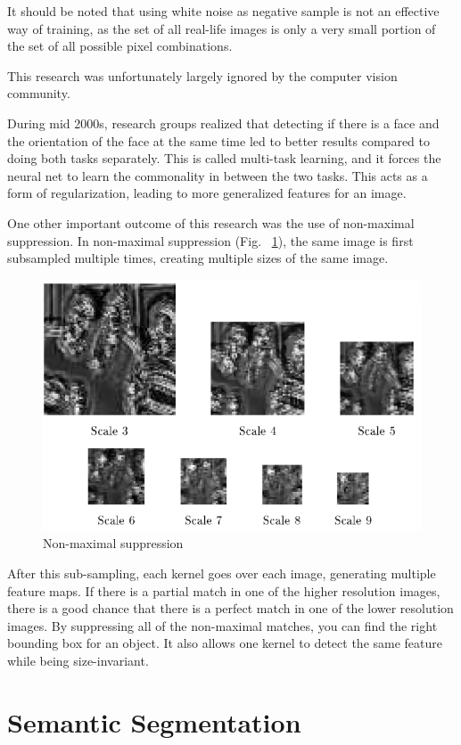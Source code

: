 It should be noted that using white noise as negative sample is not an effective way of training, as the set of all real-life images is only a very small portion of the set of all possible pixel combinations.

This research was unfortunately largely ignored by the computer vision community.

During mid 2000s, research groups realized that detecting if there is a face and the orientation of the face at the same time led to better results compared to doing both tasks separately.
This is called multi-task learning, and it forces the neural net to learn the commonality in between the two tasks.
This acts as a form of regularization, leading to more generalized features for an image.

One other important outcome of this research was the use of non-maximal suppression.
In non-maximal suppression (Fig. ~\ref{fig:NonMaxSupp}), the same image is first subsampled multiple times, creating multiple sizes of the same image.

\begin{figure}[ht]
\centering
	\includegraphics[width=0.5\linewidth]{lectures/04-a/images/non-max-supp.png}
	 \caption{Non-maximal suppression}
	\label{fig:NonMaxSupp}
\end{figure}

After this sub-sampling, each kernel goes over each image, generating multiple feature maps.
If there is a partial match in one of the higher resolution images, there is a good chance that there is a perfect match in one of the lower resolution images.
By suppressing all of the non-maximal matches, you can find the right bounding box for an object.
It also allows one kernel to detect the same feature while being size-invariant.



\section{Semantic Segmentation}

